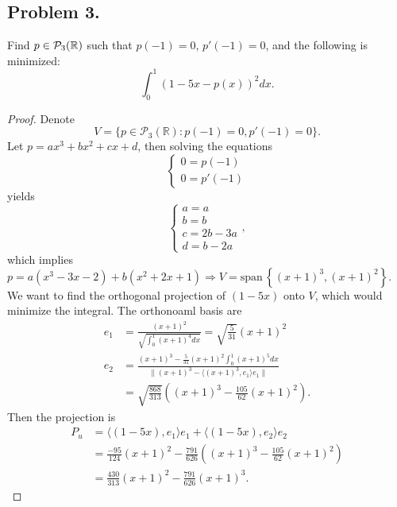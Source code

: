 \documentclass{article}
\newcommand*{\spann}{\ensuremath{\mathrm{span}}\,}
\renewcommand*{\implies}{\ensuremath{\Longrightarrow}}
\newcommand*{\R}{\ensuremath{\mathbb{R}}}
\newcommand*{\p}{\ensuremath{\mathcal{P}}}
\begin{document}
\subsection*{Problem 3.}
Find $p\in {\cal P}_3(\R)$  such that $p(-1)=0$, $p'(-1)=0$, and the following is minimized:
$$\int_0^1 (1-5x-p(x))^2 dx.$$
\begin{proof}
    Denote $$V = \{p\in\p_3(\R):p(-1)=0, p'(-1)=0\}.$$
    Let $p=ax^3+bx^2+cx+d$, then solving the equations 
    $$\begin{cases}
        0 = p(-1) \\
        0 = p'(-1)
    \end{cases}$$ yields
    $$\begin{cases}
        a = a \\
        b = b \\
        c = 2b-3a \\
        d = b-2a
    \end{cases},$$
    which implies $p = a(x^3-3x-2)+b(x^2+2x+1)\implies V = \spann\left\{(x+1)^3,(x+1)^2\right\}$.
    We want to find the orthogonal projection of $(1-5x)$ onto $V$, which would minimize the 
    integral.
    The orthonoaml basis are 
    \begin{align*}
        e_1 & = \frac{(x+1)^2}{\sqrt{\int_{0}^{1}(x+1)^4dx}} = \sqrt{\frac{5}{31}}(x+1)^2 \\
        e_2 & = \frac{(x+1)^3 - \frac{5}{31}(x+1)^2\int_{0}^{1}(x+1)^5dx}
        {\|(x+1)^3-\langle(x+1)^3, e_1\rangle e_1\|} \\
        & = \sqrt{\frac{868}{313}}\left((x+1)^3 - \frac{105}{62}(x+1)^2\right).
    \end{align*}
    Then the projection is 
    \begin{align*}
        P_u & = \langle (1-5x), e_1\rangle e_1 + \langle (1-5x), e_2\rangle e_2 \\
        & = \frac{-95}{124}(x+1)^2 - \frac{791}{626}\left((x+1)^3-\frac{105}{62}(x+1)^2\right) \\
        & = \frac{430}{313}(x+1)^2 - \frac{791}{626}(x+1)^3.
    \end{align*}
\end{proof}


\newpage
\end{document}
